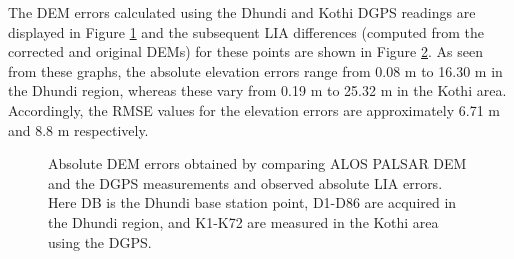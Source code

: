 \documentclass[review]{elsarticle}
\numberwithin{equation}{section}
\numberwithin{figure}{section}
\numberwithin{table}{section}
\begin{document}
The DEM errors calculated using the Dhundi and Kothi DGPS readings are displayed in Figure \ref{subfig:dem_error} and the subsequent LIA differences (computed from the corrected and original DEMs) for these points are shown in Figure \ref{subfig:lia_error}. As seen from these graphs, the absolute elevation errors range from 0.08 m to 16.30 m in the Dhundi region, whereas these vary from 0.19 m to 25.32 m in the Kothi area. Accordingly, the RMSE values for the elevation errors are approximately 6.71 m and 8.8 m respectively.

\begin{figure}[!htbp]
    \centering
    \begin{subfigure}[t]{\textwidth}
        \caption{}
        \label{subfig:dem_error}
    \end{subfigure}
    \begin{subfigure}[t]{\textwidth}
        \caption{}
        \label{subfig:lia_error}
    \end{subfigure}
    \caption{ Absolute DEM errors obtained by comparing ALOS PALSAR DEM and the DGPS measurements and  observed absolute LIA errors. Here DB is the Dhundi base station point, D1-D86 are acquired in the Dhundi region, and K1-K72 are measured in the Kothi area using the DGPS.}
    \label{fig:error}
\end{figure}
\end{document}
